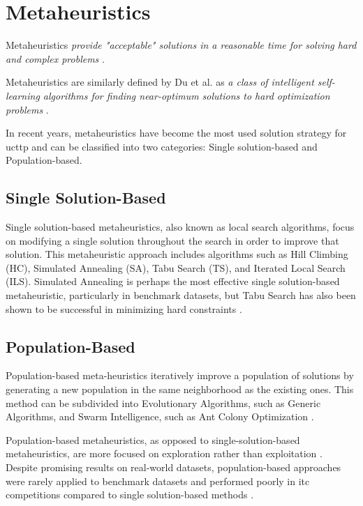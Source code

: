 \section{Metaheuristics}

Metaheuristics \textit{provide "acceptable" solutions in a reasonable time for solving hard and complex problems} \cite{talbi2009metaheuristics}. 

Metaheuristics are similarly defined by Du et al. as \textit{a class of intelligent self-learning algorithms for finding near-optimum solutions to hard optimization problems} \cite{du2016search}.

In recent years, metaheuristics have become the most used solution strategy for \ac{ucttp} and can be classified into two categories: Single solution-based and Population-based.

\subsection{Single Solution-Based}

Single solution-based metaheuristics, also known as local search algorithms, focus on modifying a single solution throughout the search in order to improve that solution. This metaheuristic approach includes algorithms such as Hill Climbing (HC), Simulated Annealing (SA), Tabu Search (TS), and Iterated Local Search (ILS). Simulated Annealing is perhaps the most effective single solution-based metaheuristic, particularly in benchmark datasets, but Tabu Search has also been shown to be successful in minimizing hard constraints \cite{abdipoor_meta-heuristic_2023}.

\subsection{Population-Based}

Population-based meta-heuristics iteratively improve a population of solutions by generating a new population in the same neighborhood as the existing ones. This method can be subdivided into Evolutionary Algorithms, such as Generic Algorithms, and Swarm Intelligence, such as Ant Colony Optimization \cite{abdipoor_meta-heuristic_2023,du2016search}.

Population-based metaheuristics, as opposed to single-solution-based metaheuristics, are more focused on exploration rather than exploitation \cite{talbi2009metaheuristics,du2016search}. Despite promising results on real-world datasets, population-based approaches were rarely applied to benchmark datasets and performed poorly in \ac{itc} competitions compared to single solution-based methods \cite{abdipoor_meta-heuristic_2023}.

